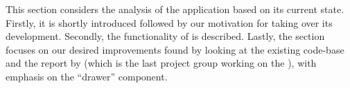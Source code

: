 This section considers the analysis of the \launcher application based on its current state.
Firstly, it is shortly introduced followed by our motivation for taking over its development.
Secondly, the functionality of \launcher is described.
Lastly, the section focuses on our desired improvements found by looking at the existing code-base and the report by \citet{launcher2012} (which is the last project group working on the \launcher), with emphasis on the ``drawer'' component.